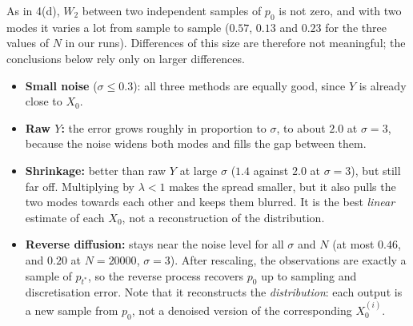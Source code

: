 \documentclass[11pt]{article}
\begin{document}
As in 4(d), $W_2$ between two independent samples of $p_0$ is not zero, and with two modes it varies a lot from sample to sample
($0.57$, $0.13$ and $0.23$ for the three values of $N$ in our runs). Differences of this size are therefore not meaningful; the
conclusions below rely only on larger differences.
\begin{itemize}
\item \textbf{Small noise} ($\sigma\le0.3$): all three methods are equally good, since $Y$ is already close to $X_0$.
\item \textbf{Raw $Y$:} the error grows roughly in proportion to $\sigma$, to about $2.0$ at $\sigma=3$, because the noise widens both modes
and fills the gap between them.
\item \textbf{Shrinkage:} better than raw $Y$ at large $\sigma$ ($1.4$ against $2.0$ at $\sigma=3$), but still far off. Multiplying by $\lambda<1$
makes the spread smaller, but it also pulls the two modes towards each other and keeps them blurred. It is the best
\emph{linear} estimate of each $X_0$, not a reconstruction of the distribution.
\item \textbf{Reverse diffusion:} stays near the noise level for all $\sigma$ and $N$ (at most $0.46$, and $0.20$ at $N=20000$, $\sigma=3$). After
rescaling, the observations are exactly a sample of $p_{t^*}$, so the reverse process recovers $p_0$ up to sampling and
discretisation error. Note that it reconstructs the \emph{distribution}: each output is a new sample from $p_0$, not a denoised
version of the corresponding $X_0^{(i)}$.
\end{itemize}
\end{document}

